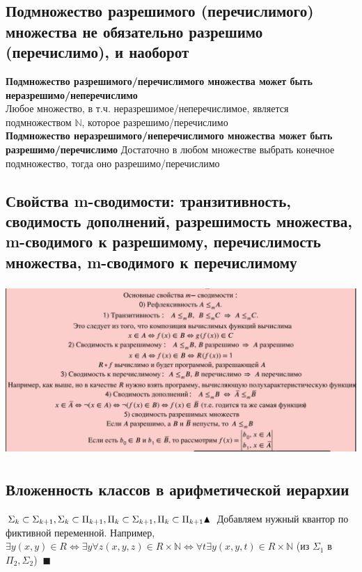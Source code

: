 \subsection{Подмножество разрешимого (перечислимого) множества не обязательно разрешимо (перечислимо), и наоборот}
\textbf{Подмножество разрешимого/перечислимого множества может быть неразрешимо/неперечислимо}
\\
Любое множество, в т.ч. неразрешимое/неперечислимое, является подмножеством $\mathbb{N}$, которое разрешимо/перечислимо
\\
\textbf{Подмножество неразрешимого/неперечислимого множества может быть разрешимо/перечислимо}
Достаточно в любом множестве выбрать конечное подмножество, тогда оно разрешимо/перечислимо

\subsection{Свойства m-сводимости: транзитивность, сводимость дополнений, разрешимость
множества, m-сводимого к разрешимому, перечислимость множества, m-сводимого
к перечислимому}
\begin{center}
    \includegraphics[width = 17cm, height = 6.5cm]{images/3 (определения)_m34.PNG}
\end{center}

\subsection{Вложенность классов в арифметической иерархии}
$\Sigma_k \subset \Sigma_{k+1}, \Sigma_k \subset \Pi_{k+1}, \Pi_k \subset \Sigma_{k+1}, \Pi_k \subset \Pi_{k+1} \\ \blacktriangle$ Добавляем нужный квантор по фиктивной переменной. Например, $\exists y (x,y) \in R \Longleftrightarrow \exists y \forall z (x,y,z)\in R \times \mathbb{N} \Longleftrightarrow \forall t \exists y (x,y,t) \in R\times \mathbb{N}$ (из $\Sigma_1$ в $\Pi_2, \Sigma_2$) $\ \blacksquare$

